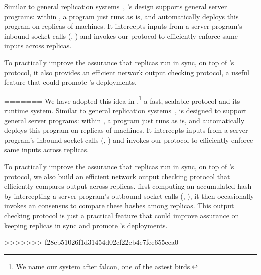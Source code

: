 Similar to general replication 
systems~\cite{eve:osdi12,rex:eurosys14,crane:sosp15}, \xxx's design supports 
general server programs: within \xxx, a program just runs as is, and \xxx 
automatically deploys this program on replicas of machines. It intercepts inputs 
from a server program's inbound socket calls (\eg, \recv) and invokes our \paxos 
protocol to efficiently enforce same inputs across replicas.

To practically improve the assurance that replicas run in sync, on top of 
\xxx's \paxos protocol, it also provides an efficient network output checking 
protocol, a useful feature that could promote \xxx's deployments. 

=======
We have adopted this idea in \xxx,\footnote{We name our system after
falcon, one of the astest birds.} a fast, scalable \paxos protocol and its
runtime system. Similar to general replication
systems~\cite{eve:osdi12,rex:eurosys14,crane:sosp15}, \xxx is designed to
support general server programs: within \xxx, a program just runs
as is, and \xxx automatically deploys this program on replicas of machines. It
intercepts inputs from a server program's inbound socket calls (\eg, \recv) and
invokes our \paxos protocol to efficiently enforce same inputs across
replicas.

To practically improve the assurance that replicas run in sync, on top of
\xxx's \paxos protocol, we also build an efficient network output checking
protocol that efficiently compares output across replicas. first computing an
accumulated hash by intercepting a server program's outbound socket calls (\eg,
\send), it then occasionally invokes an consensus to compare these hashes among
replicas. This output checking protocol is just a practical feature that could
improve assurance on keeping replicas in sync and promote \xxx's deployments.

>>>>>>> f28eb51026f1d31454d02cf22eb4e7fee655eea0


